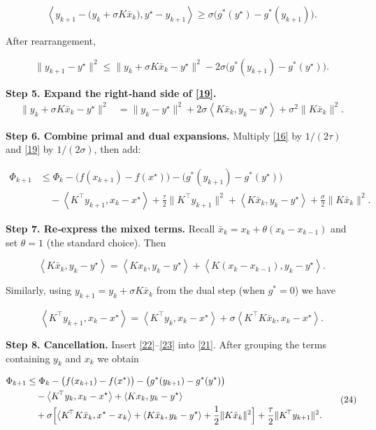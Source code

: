 \documentclass{article}
\newcommand{\inner}[2]{\left\langle #1,#2\right\rangle}
\begin{document}
\[
\inner{y_{k+1}-\bigl(y_{k}+\sigma K\bar x_{k}\bigr)}{y^{\star}-y_{k+1}}
\ge \sigma\bigl(g^{*}(y^{\star})-g^{*}(y_{k+1})\bigr).
\tag{18}
\]

After rearrangement,

\[
\|y_{k+1}-y^{\star}\|^{2}
\le\|y_{k}+\sigma K\bar x_{k}-y^{\star}\|^{2}
-2\sigma\bigl(g^{*}(y_{k+1})-g^{*}(y^{\star})\bigr).
\tag{19}
\]

\noindent\textbf{Step 5.  Expand the right‑hand side of \eqref{19}.}
\[
\begin{aligned}
\|y_{k}+\sigma K\bar x_{k}-y^{\star}\|^{2}
&=\|y_{k}-y^{\star}\|^{2}
+2\sigma\inner{K\bar x_{k}}{y_{k}-y^{\star}}
+\sigma^{2}\|K\bar x_{k}\|^{2}.
\end{aligned}
\tag{20}
\]

\noindent\textbf{Step 6.  Combine primal and dual expansions.}  
Multiply \eqref{16} by $1/(2\tau)$ and \eqref{19} by $1/(2\sigma)$, then add:

\[
\begin{aligned}
\Phi_{k+1}
&\le \Phi_{k}
-\bigl(f(x_{k+1})-f(x^{\star})\bigr)
-\bigl(g^{*}(y_{k+1})-g^{*}(y^{\star})\bigr) \\[2mm]
&\quad
-\inner{K^{\!\top}y_{k+1}}{x_{k}-x^{\star}}
+\frac{\tau}{2}\|K^{\!\top}y_{k+1}\|^{2}
+\inner{K\bar x_{k}}{y_{k}-y^{\star}}
+\frac{\sigma}{2}\|K\bar x_{k}\|^{2}.
\end{aligned}
\tag{21}
\]

\noindent\textbf{Step 7.  Re‑express the mixed terms.}  
Recall $\bar x_{k}=x_{k}+\theta (x_{k}-x_{k-1})$ and set $\theta=1$ (the
standard choice). Then  

\[
\inner{K\bar x_{k}}{y_{k}-y^{\star}}
=\inner{Kx_{k}}{y_{k}-y^{\star}}
+\inner{K(x_{k}-x_{k-1})}{y_{k}-y^{\star}}.
\tag{22}
\]

Similarly, using $y_{k+1}=y_{k}+\sigma K\bar x_{k}$ from the dual step (when $g^{*}=0$) we have  

\[
\inner{K^{\!\top}y_{k+1}}{x_{k}-x^{\star}}
=\inner{K^{\!\top}y_{k}}{x_{k}-x^{\star}}
+\sigma\inner{K^{\!\top}K\bar x_{k}}{x_{k}-x^{\star}}.
\tag{23}
\]

\noindent\textbf{Step 8.  Cancellation.}  
Insert \eqref{22}–\eqref{23} into \eqref{21}. After grouping the terms
containing $y_{k}$ and $x_{k}$ we obtain

\[
\begin{aligned}
\Phi_{k+1}
&\le \Phi_{k}
-\bigl(f(x_{k+1})-f(x^{\star})\bigr)
-\bigl(g^{*}(y_{k+1})-g^{*}(y^{\star})\bigr)\\
&\quad
-\inner{K^{\!\top}y_{k}}{x_{k}-x^{\star}}
+\inner{Kx_{k}}{y_{k}-y^{\star}}\\
&\quad
+\sigma\Bigl[
\inner{K^{\!\top}K\bar x_{k}}{x^{\star}-x_{k}}
+\inner{K\bar x_{k}}{y_{k}-y^{\star}}
+\frac{1}{2}\|K\bar x_{k}\|^{2}
\Bigr]
+\frac{\tau}{2}\|K^{\!\top}y_{k+1}\|^{2}.
\end{aligned}
\tag{24}
\]
\end{document}
